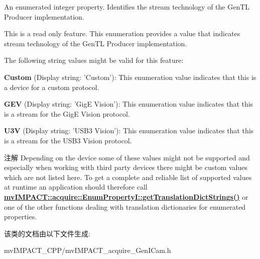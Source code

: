 An enumerated integer property. Identifies the stream technology of the Gen\+T\+L Producer implementation. 

This is a read only feature. This enumeration provides a value that indicates stream technology of the Gen\+T\+L Producer implementation.

The following string values might be valid for this feature\+:
\begin{DoxyItemize}
\item {\bfseries Custom} (Display string\+: 'Custom')\+: This enumeration value indicates that this is a device for a custom protocol.
\item {\bfseries G\+E\+V} (Display string\+: 'Gig\+E Vision')\+: This enumeration value indicates that this is a stream for the Gig\+E Vision protocol.
\item {\bfseries U3\+V} (Display string\+: 'U\+S\+B3 Vision')\+: This enumeration value indicates that this is a stream for the U\+S\+B3 Vision protocol.
\end{DoxyItemize}

\begin{DoxyNote}{注解}
Depending on the device some of these values might not be supported and especially when working with third party devices there might be custom values which are not listed here. To get a complete and reliable list of supported values at runtime an application should therefore call {\bfseries \hyperlink{classmv_i_m_p_a_c_t_1_1acquire_1_1_enum_property_i_a0ba6ccbf5ee69784d5d0b537924d26b6}{mv\+I\+M\+P\+A\+C\+T\+::acquire\+::\+Enum\+Property\+I\+::get\+Translation\+Dict\+Strings()}} or one of the other functions dealing with translation dictionaries for enumerated properties. 
\end{DoxyNote}


该类的文档由以下文件生成\+:\begin{DoxyCompactItemize}
\item 
mv\+I\+M\+P\+A\+C\+T\+\_\+\+C\+P\+P/mv\+I\+M\+P\+A\+C\+T\+\_\+acquire\+\_\+\+Gen\+I\+Cam.\+h\end{DoxyCompactItemize}
